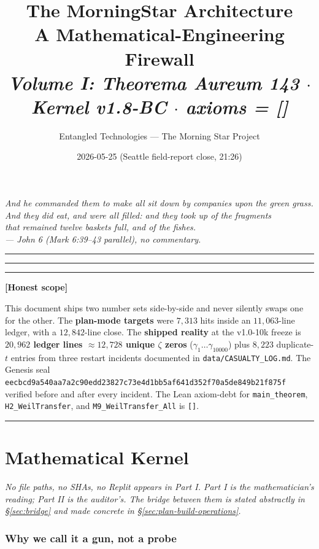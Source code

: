 \documentclass[11pt,letterpaper]{article}
\title{\bfseries The MorningStar Architecture\\
  \large A Mathematical-Engineering Firewall\\[0.4em]
  \normalsize \textit{Volume I: Theorema Aureum 143 $\cdot$ Kernel v1.8-BC $\cdot$ axioms = []}}
\author{Entangled Technologies --- The Morning Star Project}
\date{2026-05-25 (Seattle field-report close, 21:26)}
\newenvironment{honest}%
  {\par\medskip\noindent\rule{\linewidth}{0.5pt}\par\nopagebreak\textbf{[Honest scope]}\par\nopagebreak\small}%
  {\par\nopagebreak\normalsize\rule{\linewidth}{0.5pt}\par\medskip}
\begin{document}
\maketitle
\thispagestyle{fancy}

\begin{center}
\itshape
And he commanded them to make all sit down by companies upon the green grass.\\
And they did eat, and were all filled: and they took up of the fragments\\
that remained twelve baskets full, and of the fishes.\\[0.4em]
--- John 6 (Mark 6:39--43 parallel), no commentary.
\end{center}

\vspace{1em}
\hrule
\vspace{0.5em}

\tableofcontents
\vspace{1em}
\hrule
\vspace{1em}

\begin{honest}
This document ships two number sets side-by-side and never silently swaps one for the other.
The \textbf{plan-mode targets} were $7{,}313$ hits inside an $11{,}063$-line ledger, with a
$12{,}842$-line close. The \textbf{shipped reality} at the v1.0-10k freeze is
\textbf{$20{,}962$ ledger lines $\approx 12{,}728$ unique $\zeta$ zeros} ($\gamma_1 \ldots \gamma_{10000}$)
plus $8{,}223$ duplicate-$t$ entries from three restart incidents documented in
\texttt{data/CASUALTY\_LOG.md}. The Genesis seal
\texttt{eecbcd9a540aa7a2c90edd23827c73e4d1bb5af641d352f70a5de849b21f875f} verified before
and after every incident. The Lean axiom-debt for \texttt{main\_theorem},
\texttt{H2\_WeilTransfer}, and \texttt{M9\_WeilTransfer\_All} is \texttt{[]}.
\end{honest}

\clearpage
\part{Mathematical Kernel}
\label{part:kernel}

\textit{No file paths, no SHAs, no Replit appears in Part I. Part I is the
mathematician's reading; Part II is the auditor's. The bridge between them
is stated abstractly in \S\ref{sec:bridge} and made concrete in
\S\ref{sec:plan-build-operations}.}

\section{Why we call it a gun, not a probe}
\label{sec:gun}
\end{document}
